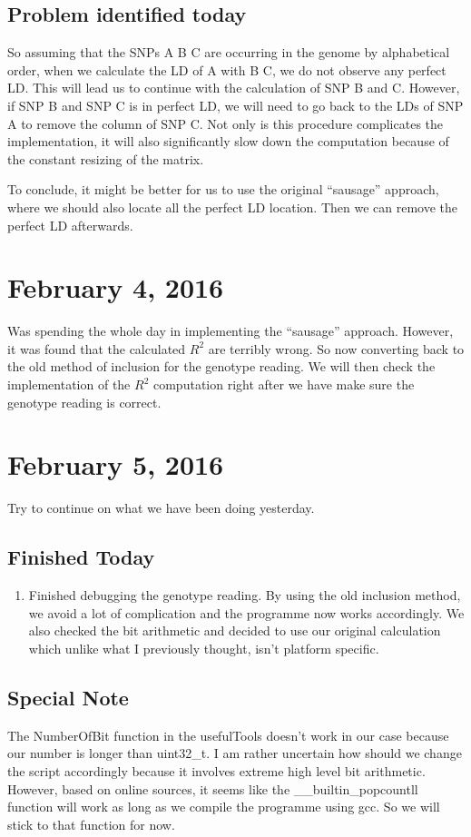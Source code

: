 \documentclass[12pt]{article}
\begin{document}
	\subsection{Problem identified today}
	So assuming that the SNPs A B C are occurring in the genome by alphabetical order, when we calculate the LD of A with B C, we do not observe any perfect LD. 
	This will lead us to continue with the calculation of SNP B and C. 
	However, if SNP B and SNP C is in perfect LD, we will need to go back to the LDs of SNP A to remove the column of SNP C.
	Not only is this procedure complicates the implementation, it will also significantly slow down the computation because of the constant resizing of the matrix.
	
	To conclude, it might be better for us to use the original ``sausage'' approach, where we should also locate all the perfect LD location.
	Then we can remove the perfect LD afterwards.
	
	\section{February 4, 2016}
	Was spending the whole day in implementing the ``sausage'' approach.
	However, it was found that the calculated $R^2$ are terribly wrong. 
	So now converting back to the old method of inclusion for the genotype reading.
	We will then check the implementation of the $R^2$ computation right after we have make sure the genotype reading is correct.
	\section{February 5, 2016}
	Try to continue on what we have been doing yesterday.
	\subsection{Finished Today}
	\begin{enumerate}
		\item 	Finished debugging the genotype reading.
				By using the old inclusion method, we avoid a lot of complication and the programme now works accordingly.
				We also checked the bit arithmetic and decided to use our original calculation which unlike what I previously thought, isn't platform specific.
				
	\end{enumerate}
	\subsection{Special Note}
	The NumberOfBit function in the usefulTools doesn't work in our case because our number is longer than uint32\_t. 
	I am rather uncertain how should we change the script accordingly because it involves extreme high level bit arithmetic.
	However, based on online sources, it seems like the \_\_builtin\_popcountll function will work as long as we compile the programme using gcc.
	So we will stick to that function for now.
	
\end{document}
